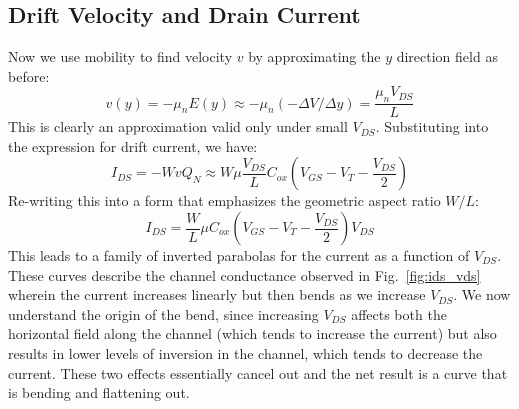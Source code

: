 \subsection{Drift Velocity and Drain Current}
Now we use mobility to find velocity $v$ by approximating the $y$ direction field as before:
    \begin{equation}
        v(y) =  - {\mu _n}E(y) \approx  - {\mu _n}( - \Delta V/\Delta y) = \frac{{{\mu _n}{V_{DS}}}}{L}
    \end{equation}
This is clearly an approximation valid only under small $V_{DS}$.  Substituting into the expression for drift current, we have:
    \begin{equation}
        I_{DS} =  - Wv{Q_N} \approx W\mu \frac{{{V_{DS}}}}{L}{C_{ox}}({V_{GS}} - {V_T} - \frac{{{V_{DS}}}}{2})
    \end{equation}
Re-writing this into a form that emphasizes the geometric aspect ratio $W/L$:
    \begin{equation}
        I_{DS} = \frac{W}{L}\mu {C_{ox}}({V_{GS}} - {V_T} - \frac{{{V_{DS}}}}{2}){V_{DS}}
    \end{equation}
This leads to a family of inverted parabolas for the current as a function of $V_{DS}$.  These curves describe the channel conductance observed in Fig.~\ref{fig:ids_vds} wherein the current increases linearly but then bends as we increase $V_{DS}$.  We now understand the origin of the bend, since increasing $V_{DS}$ affects both the horizontal field along the channel (which tends to increase the current) but also results in lower levels of inversion in the channel, which tends to decrease the current.  These two effects essentially cancel out and the net result is a curve that is bending and flattening out.
